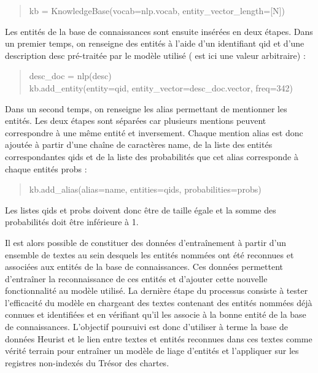 \documentclass[a4paper,12pt,twoside]{book}
\begin{document}
	\begin{quotation}
		kb = KnowledgeBase(vocab=nlp.vocab, entity\_vector\_length=[N])
	\end{quotation}
	
	Les entités de la base de connaissances sont ensuite insérées en deux étapes. Dans un premier temps, on renseigne des entités à l'aide d'un identifiant \og qid\fg{} et d'une description \og desc\fg{} pré-traitée par le modèle utilisé (\fg{} est ici une valeur arbitraire) :
	
	\begin{quotation}
			desc\_doc = nlp(desc)\\
			\indent kb.add\_entity(entity=qid, entity\_vector=desc\_doc.vector, freq=342)
	\end{quotation}
	
	Dans un second temps, on renseigne les alias permettant de mentionner les entités. Les deux étapes sont séparées car plusieurs mentions peuvent correspondre à une même entité et inversement. Chaque mention \og alias\fg{} est donc ajoutée à partir d'une chaîne de caractères \og name\fg{}, de la liste des entités correspondantes \og qids\fg{} et de la liste des probabilités que cet alias corresponde à chaque entités \og probs\fg{} :
	
	\begin{quotation}
		kb.add\_alias(alias=name, entities=qids, probabilities=probs)
	\end{quotation}
	
	\noindent Les listes \og qids\fg{} et \og probs\fg{} doivent donc être de taille égale et la somme des probabilités doit être inférieure à 1.
	
	Il est alors possible de constituer des données d'entraînement à partir d'un ensemble de textes au sein desquels les entités nommées ont été reconnues et associées aux entités de la base de connaissances. Ces données permettent d'entraîner la reconnaissance de ces entités et d'ajouter cette nouvelle fonctionnalité au modèle utilisé. La dernière étape du processus consiste à tester l'efficacité du modèle en chargeant des textes contenant des entités nommées déjà connues et identifiées et en vérifiant qu'il les associe à la bonne entité de la base de connaissances. L'objectif poursuivi est donc d'utiliser à terme la base de données Heurist et le lien entre textes et entités reconnues dans ces textes comme vérité terrain pour entraîner un modèle de liage d'entités et l'appliquer sur les registres non-indexés du Trésor des chartes.
	
\end{document}
